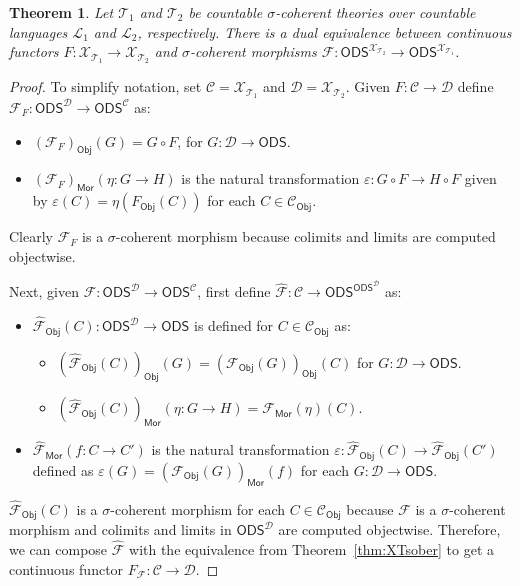 \documentclass{article}
\theoremstyle{plain}
\newtheorem{theorem}[Theorem]{Theorem}
\def\cal#1{{\mathcal #1}}
\def\calC{{\cal C}}
\def\calD{{\cal D}}
\def\calF{{\cal F}}
\def\calL{{\cal L}}
\def\calT{{\cal T}}
\def\calX{{\cal X}}
\newcommand{\ODS}{{\mathsf{ODS}}}
\newcommand{\Mor}{\mathsf{Mor}}
\newcommand{\Obj}{\mathsf{Obj}}
\begin{document}
\begin{theorem}
Let $\calT_1$ and $\calT_2$ be countable $\sigma$-coherent theories over countable languages $\calL_1$ and $\calL_2$, respectively. There is a dual equivalence between continuous functors $F\colon \calX_{\calT_1} \to \calX_{\calT_2}$ and $\sigma$-coherent morphisms $\calF\colon \ODS^{\calX_{\calT_2}} \to \ODS^{\calX_{\calT_1}}$.
\end{theorem}
\begin{proof}
To simplify notation, set $\calC=\calX_{\calT_1}$ and $\calD=\calX_{\calT_2}$. Given $F\colon \calC\to\calD$ define $\calF_F\colon \ODS^\calD \to \ODS^\calC$ as:
\begin{itemize}
\item
$(\calF_F)_\Obj(G) = G\circ F$, for $G\colon \calD\to\ODS$.
\item
$(\calF_F)_\Mor(\eta\colon G\to H)$ is the natural transformation $\varepsilon \colon G\circ F \to H\circ F$ given by $\varepsilon(C)=\eta(F_\Obj(C))$ for each $C\in\calC_\Obj$.
\end{itemize}
Clearly $\calF_F$ is a $\sigma$-coherent morphism because colimits and limits are computed objectwise.

Next, given $\calF\colon \ODS^\calD \to \ODS^\calC$, first define $\widehat{\calF}\colon \calC\to \ODS^{\ODS^\calD}$ as:
\begin{itemize}
\item
$\widehat{\calF}_\Obj(C)\colon \ODS^{\calD}\to\ODS$ is defined for $C\in\calC_\Obj$ as:
\begin{itemize}
\item
$(\widehat{\calF}_\Obj(C))_\Obj(G) = (\calF_\Obj(G))_\Obj(C)$ for $G\colon \calD\to\ODS$.
\item
$(\widehat{\calF}_\Obj(C))_\Mor(\eta\colon G\to H) = \calF_\Mor(\eta)(C)$.
\end{itemize}
\item
$\widehat{\calF}_\Mor(f\colon C\to C')$ is the natural transformation $\varepsilon\colon \widehat{\calF}_\Obj(C)\to \widehat{\calF}_\Obj(C')$ defined as $\varepsilon(G) = (\calF_\Obj(G))_\Mor(f)$ for each $G\colon \calD\to\ODS$.
\end{itemize}
$\widehat{\calF}_\Obj(C)$ is a $\sigma$-coherent morphism for each $C\in\calC_\Obj$ because $\calF$ is a $\sigma$-coherent morphism and colimits and limits in $\ODS^\calD$ are computed objectwise. Therefore, we can compose $\widehat{\calF}$ with the equivalence from Theorem~\ref{thm:XTsober} to get a continuous functor $F_\calF\colon\calC\to\calD$.


\end{proof}
\end{document}
